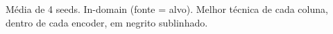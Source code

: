 \begin{table}[htbp]
\centering
\small
\caption{Centralizado: acurácia (\%) por encoder, dataset e técnica --- rótulo cheio, full fine-tuning}
\label{tab:t1_centralizado_encoder_dataset}

\par\vspace{2pt}\footnotesize Média de 4 seeds. In-domain (fonte = alvo). Melhor técnica de cada coluna, dentro de cada encoder, em negrito sublinhado.
\end{table}
